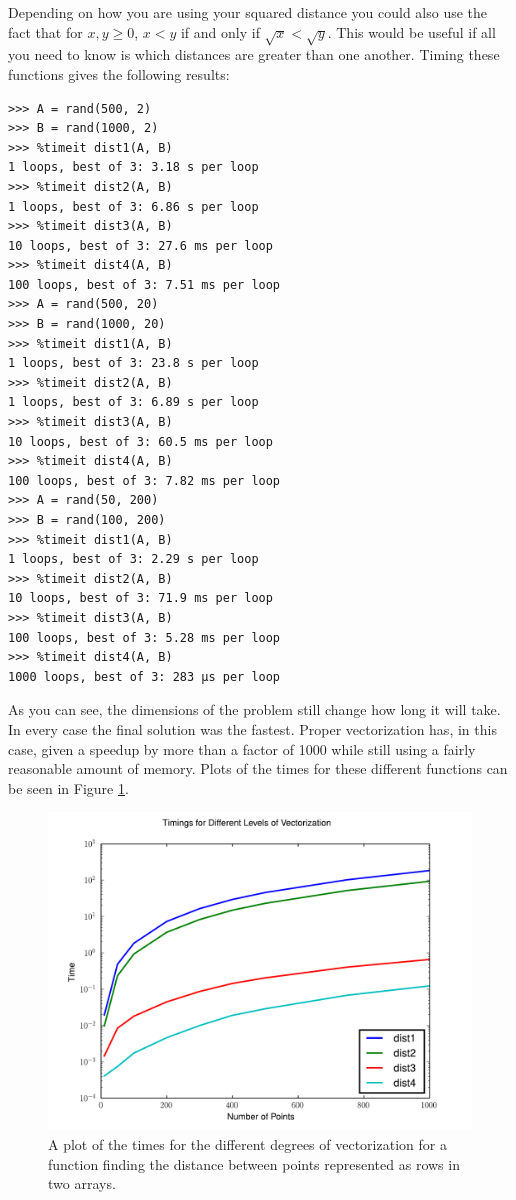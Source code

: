 Depending on how you are using your squared distance you could also use the fact that for $x, y \geq 0$, $x < y$ if and only if $\sqrt{x} < \sqrt{y}$.
This would be useful if all you need to know is which distances are greater than one another.
Timing these functions gives the following results:
\begin{lstlisting}
>>> A = rand(500, 2)
>>> B = rand(1000, 2)
>>> %timeit dist1(A, B)
1 loops, best of 3: 3.18 s per loop
>>> %timeit dist2(A, B)
1 loops, best of 3: 6.86 s per loop
>>> %timeit dist3(A, B)
10 loops, best of 3: 27.6 ms per loop
>>> %timeit dist4(A, B)
100 loops, best of 3: 7.51 ms per loop
>>> A = rand(500, 20)
>>> B = rand(1000, 20)
>>> %timeit dist1(A, B)
1 loops, best of 3: 23.8 s per loop
>>> %timeit dist2(A, B)
1 loops, best of 3: 6.89 s per loop
>>> %timeit dist3(A, B)
10 loops, best of 3: 60.5 ms per loop
>>> %timeit dist4(A, B)
100 loops, best of 3: 7.82 ms per loop
>>> A = rand(50, 200)
>>> B = rand(100, 200)
>>> %timeit dist1(A, B)
1 loops, best of 3: 2.29 s per loop
>>> %timeit dist2(A, B)
10 loops, best of 3: 71.9 ms per loop
>>> %timeit dist3(A, B)
100 loops, best of 3: 5.28 ms per loop
>>> %timeit dist4(A, B)
1000 loops, best of 3: 283 µs per loop
\end{lstlisting}
As you can see, the dimensions of the problem still change how long it will take.
In every case the final solution was the fastest.
Proper vectorization has, in this case, given a speedup by more than a factor of 1000 while still using a fairly reasonable amount of memory.
Plots of the times for these different functions can be seen in Figure \ref{distplot}.

\begin{figure}
\includegraphics[width=\textwidth]{distplot.pdf}
\caption{A plot of the times for the different degrees of vectorization for a function finding the distance between points represented as rows in two arrays.}
\label{distplot}
\end{figure}

